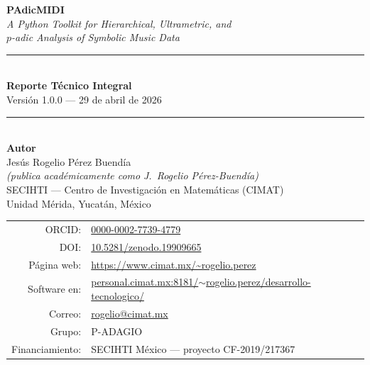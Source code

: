 \documentclass[11pt,a4paper,oneside]{article}
\theoremstyle{plain}
\theoremstyle{definition}
\theoremstyle{remark}
\begin{document}
\begin{titlepage}
  \thispagestyle{empty}
  \centering
  \vspace*{1.5cm}

  {\Huge\bfseries\color{accentdark} PAdicMIDI}\\[0.4cm]
  {\large\itshape A Python Toolkit for Hierarchical, Ultrametric, and \\
                  $p$-adic Analysis of Symbolic Music Data}\\[1.5cm]

  \rule{\linewidth}{1pt}\\[0.5cm]
  {\LARGE\bfseries Reporte Técnico Integral}\\[0.3cm]
  {\large Versión 1.0.0 --- 29 de abril de 2026}\\[0.3cm]
  \rule{\linewidth}{1pt}\\[2cm]

  {\large\bfseries Autor}\\[0.3cm]
  {\Large Jesús Rogelio Pérez Buendía}\\[0.2cm]
  {\itshape (publica académicamente como}
  {\itshape J.~Rogelio Pérez-Buendía)}\\[0.6cm]

  {\normalsize SECIHTI --- Centro de Investigación en Matemáticas (CIMAT)}\\
  {\normalsize Unidad Mérida, Yucatán, México}\\[0.3cm]

  \begin{tabular}{rl}
    ORCID:          & \href{https://orcid.org/0000-0002-7739-4779}{0000-0002-7739-4779}\\
    DOI:            & \href{https://doi.org/10.5281/zenodo.19909665}{10.5281/zenodo.19909665}\\
    Página web:     & \url{https://www.cimat.mx/~rogelio.perez}\\
    Software en:    & \href{http://personal.cimat.mx:8181/~rogelio.perez/desarrollo-tecnologico/}{personal.cimat.mx:8181/$\sim$rogelio.perez/desarrollo-tecnologico/}\\
    Correo:         & \href{mailto:rogelio@cimat.mx}{rogelio@cimat.mx}\\
    Grupo:          & P-ADAGIO\\
    Financiamiento: & SECIHTI México --- proyecto CF-2019/217367\\
  \end{tabular}\\[0.6cm]


\end{titlepage}
\end{document}
